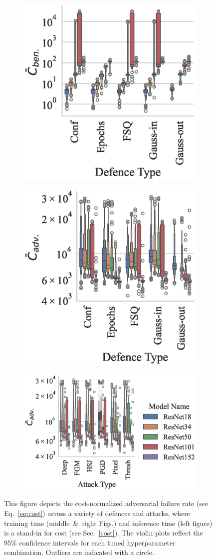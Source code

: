 \begin{figure}[!h]
    \centering
    \begin{subfigure}
        \centering
        \includegraphics[trim={0 5pt 0 5pt},clip,width=.26\textwidth]{cifar100/ben_failures_per_train_time_vs_defence_type.eps}
    \end{subfigure}
    \begin{subfigure}
        \centering
        \includegraphics[trim={0 5pt 0 5pt},clip,width=.26\textwidth]{cifar100/adv_failures_per_train_time_vs_defence_type.eps}
    \end{subfigure}
    \begin{subfigure}
        \centering
        \includegraphics[trim={0 5pt 0 5pt},clip,width=.4\textwidth]{cifar100/adv_failures_per_train_time_vs_attack_type.eps}
    \end{subfigure}
    \caption{This figure depicts the cost-normalized adversarial failure rate (see Eq.~\ref{eq:cost}) across a variety of defences and attacks, where training time (middle~\&~right Figs.) and inference time (left figure) is a stand-in for cost (see Sec.~\ref{cost}). The violin plots reflect the 95\% confidence intervals for each tuned hyperparameter combination. Outliers are indicated with a circle.}
    \label{fig:failures_per_train_time}
\end{figure}




